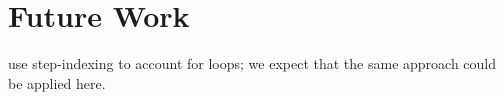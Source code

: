 \section{Future Work}

\citet{DBLP:conf/esop/PaviottiCPWOB20} use step-indexing to account for
loops; we expect that the same approach could be applied here.













